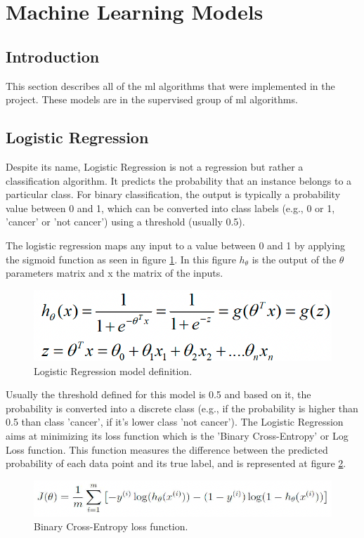 \section{Machine Learning Models}
\label{sec:ML_Models}
\subsection{Introduction}
This section describes all of the \acrfull{ml} algorithms that were implemented in the project. These models are in the supervised group of \acrshort{ml} algorithms.

\subsection{Logistic Regression}
Despite its name, Logistic Regression is not a regression but rather a classification algorithm.
It predicts the probability that an instance belongs to a particular class. For binary classification, the output is typically a probability value between 0 and 1, which can be converted into class labels (e.g., 0 or 1, 'cancer' or 'not cancer') using a threshold (usually 0.5).

The logistic regression maps any input to a value between 0 and 1 by applying the sigmoid function as seen in figure \ref{fig:logistic_reg}. In this figure \(h_\theta\) is the output of the \(\theta\) parameters matrix and x the matrix of the inputs.
\begin{figure}[!htb]
    \centering
    \includegraphics[width=0.8\linewidth]{images/logistic_reg.png}
    \caption{Logistic Regression model definition.}
    \label{fig:logistic_reg}
\end{figure}

Usually the threshold defined for this model is 0.5 and based on it, the probability is converted into a discrete class (e.g., if the probability is higher than 0.5 than class 'cancer', if it's lower class 'not cancer'). The Logistic Regression aims at minimizing its loss function which is the 'Binary Cross-Entropy' or Log Loss function. This function measures the difference between the predicted probability of each data point and its true label, and is represented at figure \ref{fig:loss_log_reg}.
\begin{figure}[!htb]
    \centering
    \includegraphics[width=0.9\linewidth]{images/loss_log_reg.png}
    \caption{Binary Cross-Entropy loss function.}
    \label{fig:loss_log_reg}
\end{figure}

